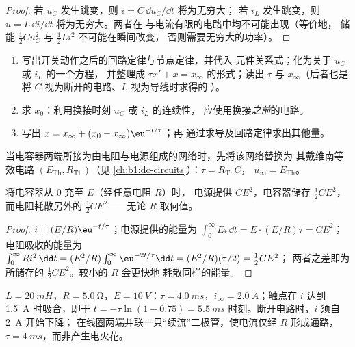 \begin{proof}
若 $u_C$ 发生跳变，则 $i = C\,\dd u_C/\dd t$ 将为无穷大；
若 $i_L$ 发生跳变，则 $u = L\,\dd i/\dd t$ 将为无穷大。两者在
与电流有限的电路中均不可能出现（等价地，
储能 $\tfrac12 Cu_C^2$ 与 $\tfrac12 Li^2$ 不可能在瞬间改变，
否则需要无穷大的功率）。
\end{proof}

\begin{method}[求解一阶暂态过程]\label{met:b1:transient-regimes:first}
\begin{enumerate}
  \item 写出开关动作之后的回路定律与节点定律，并代入
        元件关系式；化为关于 $u_C$ 或 $i_L$ 的一个方程，
        并整理成 $\tau x' + x = x_\infty$ 的形式；读出 $\tau$ 与
        $x_\infty$（后者也是将 $C$ 视为断开的电路、$L$ 视为导线时求得的
        ）。
  \item 求 $x_0$：利用换接时刻 $u_C$ 或 $i_L$ 的连续性，
        应使用换接\emph{之前}的电路。
  \item 写出 $x = x_\infty + (x_0 - x_\infty)\eu^{-t/\tau}$；再
        通过求导及回路定律求出其他量。
\end{enumerate}
当电容器两端所接为由电阻与电源组成的网络时，先将该网络替换为
其戴维南等效电路 $(E_{\mathrm{Th}}, R_{\mathrm{Th}})$（见
\cref{ch:b1:dc-circuits}）：$\tau = R_{\mathrm{Th}}C$，
$u_\infty = E_{\mathrm{Th}}$。
\end{method}

\begin{proposition}[RC 充电的能量平衡]\label{prop:b1:transient-regimes:rcenergy}
将电容器从 $0$ 充至 $E$（经任意电阻 $R$）时，
电源提供 $CE^2$，电容器储存 $\tfrac12 CE^2$，
而电阻耗散另外的 $\tfrac12 CE^2$——无论 $R$ 取何值。
\end{proposition}

\begin{proof}
$i = (E/R)\eu^{-t/\tau}$；电源提供的能量为 $\int_0^\infty Ei\,\dd t
= E \cdot (E/R)\tau = CE^2$；电阻吸收的能量为 $\int_0^\infty Ri^2\,\dd t
= (E^2/R)\int_0^\infty \eu^{-2t/\tau}\dd t = (E^2/R)(\tau/2) = \tfrac12 CE^2$；
两者之差即为所储存的 $\tfrac12 CE^2$。较小的 $R$ 会更快地
耗散同样的能量。
\end{proof}

\begin{example}[继电器线圈]\label{ex:b1:transient-regimes:relay}
$L = \qty{20}{mH}$，$R = \qty{5.0}{\ohm}$，$E = \qty{10}{V}$：$\tau =
\qty{4.0}{ms}$，$i_\infty = \qty{2.0}{A}$；触点在
$i$ 达到 \qty{1.5}{A} 时吸合，即于 $t = -\tau\ln(1 - 0.75) =
\qty{5.5}{ms}$ 时刻。断开电路时，$i$ 须自 \qty{2}{A} 开始下降；
在线圈两端并联一只“续流”二极管，使电流仅经 $R$
形成通路，$\tau = \qty{4}{ms}$，而非产生电火花。
\end{example}

